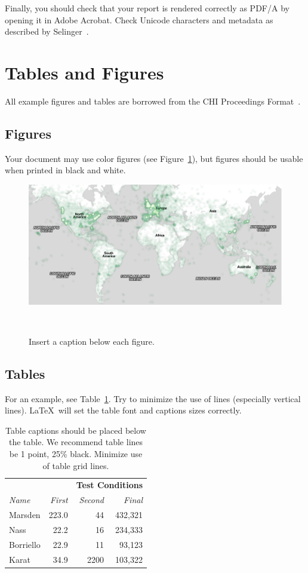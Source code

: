 \documentclass{article}
\begin{document}
Finally, you should check that your report is rendered correctly as PDF/A by opening it in Adobe Acrobat. Check Unicode characters and metadata as described by Selinger~\cite{Selinger:pdfa}.

\section{Tables and Figures}

All example figures and tables are borrowed from the CHI Proceedings Format~\cite{CHI}.

\subsection{Figures}
Your document may use color figures (see
Figure~\ref{fig:sample}), but figures should be usable when printed in black and white. 

\begin{figure}
  \begin{centering}
  \includegraphics[width=0.9\columnwidth]{map.png}
  \caption{Insert a caption below each figure.}~\label{fig:sample}
  \end{centering}
\end{figure}

\subsection{Tables}
For an example, see Table~\ref{tab:table1}. Try to
minimize the use of lines (especially vertical lines). \LaTeX\ will
set the table font and captions sizes correctly.

\begin{table}
  \centering
  \begin{tabular}{l r r r}
    & & \multicolumn{2}{c}{\small{\textbf{Test Conditions}}} \\
    \cmidrule(r){3-4}
    {\small\textit{Name}}
    & {\small \textit{First}}
      & {\small \textit{Second}}
    & {\small \textit{Final}} \\
    \midrule
    Marsden & 223.0 & 44 & 432,321 \\
    Nass & 22.2 & 16 & 234,333 \\
    Borriello & 22.9 & 11 & 93,123 \\
    Karat & 34.9 & 2200 & 103,322 \\
  \end{tabular}
  \caption{Table captions should be placed below the table. We
    recommend table lines be 1 point, 25\% black. Minimize use of
    table grid lines.}~\label{tab:table1}
\end{table}
\end{document}
